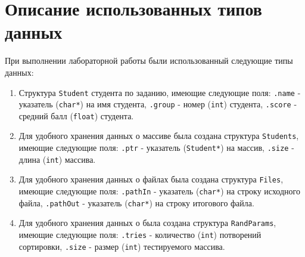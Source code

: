 \section{Описание использованных типов данных}

При выполнении лабораторной работы были использованный следующие типы данных:
\begin{enumerate}
    \item Структура \texttt{Student} студента по заданию, имеющие следующие поля:
    \texttt{.name} - указатель (\texttt{char*}) на имя студента,
    \texttt{.group} - номер (\texttt{int}) студента, \texttt{.score} - средний балл (\texttt{float}) студента.
    \item Для удобного хранения данных о массиве была создана структура \texttt{Students},
    имеющие следующие поля: \texttt{.ptr} - указатель (\texttt{Student*}) на массив,
    \texttt{.size} - длина (\texttt{int}) массива.
    \item Для удобного хранения данных о файлах была создана структура \texttt{Files},
    имеющие следующие поля: \texttt{.pathIn} - указатель (\texttt{char*}) на строку исходного файла,  
    \texttt{.pathOut} - указатель (\texttt{char*}) на строку итогового файла.
    \item Для удобного хранения данных о  была создана структура \texttt{RandParams},
    имеющие следующие поля: \texttt{.tries} - количество (\texttt{int}) потворений сортировки,  
    \texttt{.size} - размер (\texttt{int}) тестируемого массива.
\end{enumerate}
